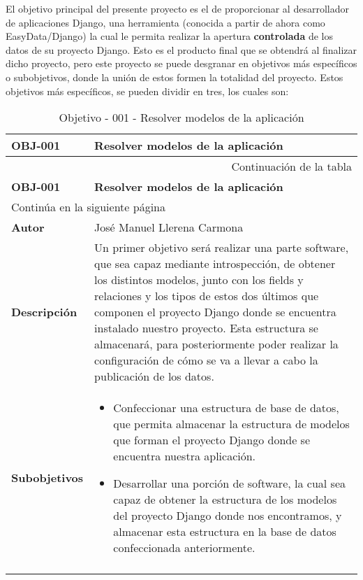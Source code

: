 El objetivo principal del presente proyecto es el de proporcionar al
desarrollador de aplicaciones Django, una herramienta (conocida a partir de
ahora como EasyData/Django) la cual le permita realizar la apertura
\textbf{controlada} de los datos de su proyecto Django. Esto es el producto
final que se obtendrá al finalizar dicho proyecto, pero este proyecto se puede
desgranar en objetivos más específicos o subobjetivos, donde la unión de estos
formen la totalidad del proyecto. Estos objetivos más específicos, se pueden
dividir en tres, los cuales son:


\begin{center}
\begin{longtable}{||p{3.4cm}|p{12cm}||}
 \hline \hline \bf OBJ-001 &  \bf Resolver modelos de la aplicación \\
\hline
\endfirsthead
\hline \multicolumn{2}{|r|}{{Continuación de la tabla}} \\ \hline
 \hline \bf OBJ-001 &  \bf Resolver modelos de la aplicación \\
\hline
\endhead
\hline \multicolumn{2}{|l|}{{Continúa en la siguiente página}} \\ \hline
\endfoot
\endlastfoot
 \hline \bf Autor & José Manuel Llerena Carmona \\
 \hline \bf Descripción & Un primer objetivo será realizar una parte software,
             que sea capaz mediante introspección, de obtener los distintos
             modelos, junto con los fields y relaciones y los tipos de estos dos
             últimos que componen el proyecto Django donde se encuentra
             instalado nuestro proyecto. Esta estructura se almacenará, para
             posteriormente poder realizar la configuración de cómo se va a
             llevar a cabo la publicación de los datos.\\
 \hline \bf Subobjetivos & 
             \begin{itemize}
                 \item Confeccionar una estructura de base de datos, que
                        permita almacenar la estructura de modelos que forman el
                        proyecto Django donde se encuentra nuestra aplicación.
                 \item Desarrollar una porción de software, la cual sea capaz de
                        obtener la estructura de los modelos del proyecto Django
                        donde nos encontramos, y almacenar esta estructura en la
                        base de datos confeccionada anteriormente.
             \end{itemize}\\
\hline
\hline
\caption{\label{tab:obj001} Objetivo - 001 - Resolver modelos de la aplicación} 
\end{longtable}
\end{center}


